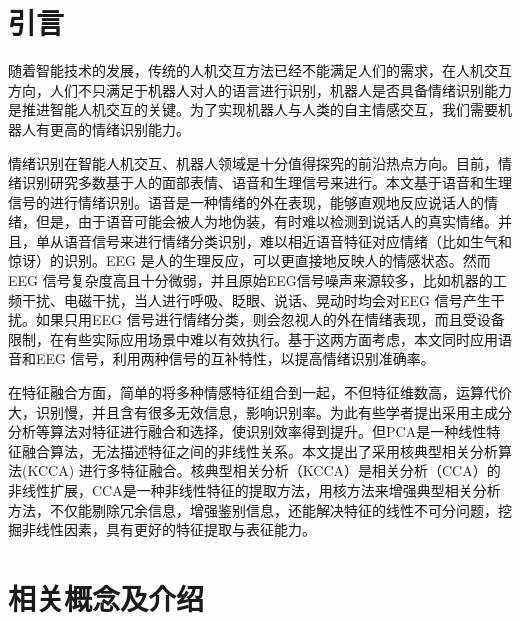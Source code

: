 \section{引言}
随着智能技术的发展，传统的人机交互方法已经不能满足人们的需求，在人机交互方向，人们不只满足于机器人对人的语言进行识别，机器人是否具备情绪识别能力是推进智能人机交互的关键。为了实现机器人与人类的自主情感交互，我们需要机器人有更高的情绪识别能力。

情绪识别在智能人机交互、机器人领域是十分值得探究的前沿热点方向。目前，情绪识别研究多数基于人的面部表情、语音和生理信号来进行。本文基于语音和生理信号的进行情绪识别。语音是一种情绪的外在表现，能够直观地反应说话人的情绪，但是，由于语音可能会被人为地伪装，有时难以检测到说话人的真实情绪。并且，单从语音信号来进行情绪分类识别，难以相近语音特征对应情绪（比如生气和惊讶）的识别。EEG 是人的生理反应，可以更直接地反映人的情感状态。然而EEG 信号复杂度高且十分微弱，并且原始EEG信号噪声来源较多，比如机器的工频干扰、电磁干扰，当人进行呼吸、眨眼、说话、晃动时均会对EEG 信号产生干扰。如果只用EEG 信号进行情绪分类，则会忽视人的外在情绪表现，而且受设备限制，在有些实际应用场景中难以有效执行。基于这两方面考虑，本文同时应用语音和EEG 信号，利用两种信号的互补特性，以提高情绪识别准确率。

在特征融合方面，简单的将多种情感特征组合到一起，不但特征维数高，运算代价大，识别慢，并且含有很多无效信息，影响识别率。为此有些学者提出采用主成分分析等算法对特征进行融合和选择，使识别效率得到提升。但PCA是一种线性特征融合算法，无法描述特征之间的非线性关系。本文提出了采用核典型相关分析算法(KCCA) 进行多特征融合。核典型相关分析（KCCA）是相关分析（CCA）的非线性扩展，CCA是一种非线性特征的提取方法，用核方法来增强典型相关分析方法，不仅能剔除冗余信息，增强鉴别信息，还能解决特征的线性不可分问题，挖掘非线性因素，具有更好的特征提取与表征能力。

\section{相关概念及介绍}
